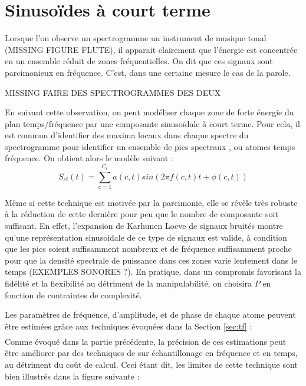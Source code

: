 \section{ \nmu Sinusoïdes à court terme}  \label{sec:sct}

Lorsque l'on observe un spectrogramme un instrument de musique tonal (MISSING FIGURE FLUTE), il apparait clairement que l'énergie est concentrée en un ensemble réduit de zones fréquentielles. On dit que ces signaux sont parcimonieux en fréquence. C'est, dans une certaine mesure le cas de la parole.

MISSING FAIRE DES SPECTROGRAMMES DES DEUX

En suivant cette observation, on peut modéliser chaque zone de forte énergie du plan temps/fréquence par une composante sinusoïdale à court terme. Pour cela, il est commun d'identifier des maxima locaux dans chaque spectre du spectrogramme pour identifier un ensemble de \og pics spectraux \fg, ou \og atomes \fg temps fréquence. On obtient alors le modèle suivant :
\begin{equation}
  S_{ct}(t) = \sum_{c=1}^{C_t} a(c,t) sin(2 \pi f(c,t) t + \phi(c,t))
\end{equation}

Même si cette technique est motivée par la parcimonie, elle se révèle très robuste à la réduction de cette dernière pour peu que le nombre de composante soit suffisant. En effet, l'expansion de Karhunen Loeve de signaux bruités montre qu'une représentation sinusoidale de ce type de signaux est valide, à condition que les pics soient suffisamment nombreux et de fréquence suffisamment proche pour que la densité spectrale de puissance dans ces zones varie lentement dans le temps \cite{mcaulay} (EXEMPLES SONORES ?). En pratique, dans un compromis favorisant la fidélité et la flexibilité au détriment de la manipulabilité, on choisira $P$ en fonction de contraintes de complexité.

Les paramètres de fréquence, d'amplitude, et de phase de chaque atome peuvent être estimées grâce aux techniques évoquées dans la Section \ref{sec:tf} :
\begin{eqnarray}
\end{eqnarray}
Comme évoqué dans la partie précédente, la précision de ces estimations peut être améliorer par des techniques de sur échantillonage en fréquence et en temps, au détriment du coût de calcul. Ceci étant dit, les limites de cette technique sont bien illustrés dans la figure suivante :

